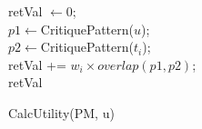 \begin{algorithm}[ht]
  \DontPrintSemicolon

  retVal $\gets 0$;\\
   {
      $p1 \gets $CritiquePattern($u$);\\
      $p2 \gets $CritiquePattern($t_i$);\\
      retVal += $w_i \times overlap(p1, p2)$;\\
  }
  \Return retVal
  \caption{CalcUtility(PM, u)}
  \label{algo:addPref2}
\end{algorithm}
